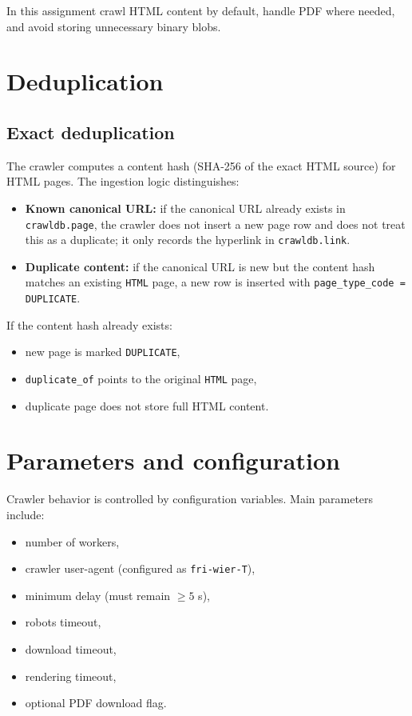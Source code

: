 \documentclass[9pt]{IEEEtran}
\begin{document}
In this assignment crawl HTML content by default, handle PDF where needed, and avoid storing unnecessary binary blobs.

\section{Deduplication}
\subsection{Exact deduplication}
The crawler computes a content hash (SHA-256 of the exact HTML source) for HTML pages. The ingestion logic distinguishes:
\begin{itemize}
    \item \textbf{Known canonical URL:} if the canonical URL already exists in \texttt{crawldb.page}, the crawler does not insert a new page row and does not treat this as a duplicate; it only records the hyperlink in \texttt{crawldb.link}.
    \item \textbf{Duplicate content:} if the canonical URL is new but the content hash matches an existing \texttt{HTML} page, a new row is inserted with \texttt{page\_type\_code = DUPLICATE}.
\end{itemize}

If the content hash already exists:
\begin{itemize}
    \item new page is marked \texttt{DUPLICATE},
    \item \texttt{duplicate\_of} points to the original \texttt{HTML} page,
    \item duplicate page does not store full HTML content.
\end{itemize}



\section{Parameters and configuration}
Crawler behavior is controlled by configuration variables. Main parameters include:
\begin{itemize}
    \item number of workers,
    \item crawler user-agent (configured as \texttt{fri-wier-T}),
    \item minimum delay (must remain $\geq 5$ s),
    \item robots timeout,
    \item download timeout,
    \item rendering timeout,
    \item optional PDF download flag.
\end{itemize}
\end{document}
